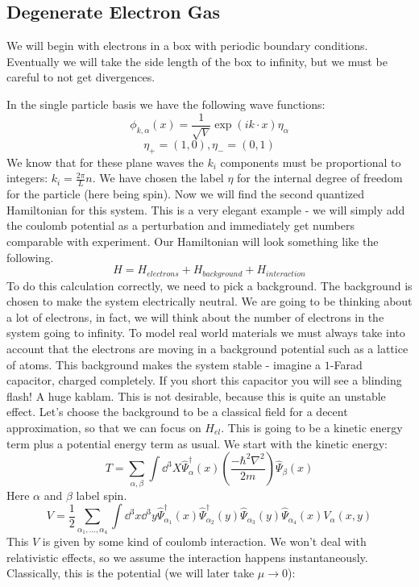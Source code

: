\documentclass{article}
\begin{document}
\subsection{Degenerate Electron Gas}
We will begin with electrons in a box with periodic boundary conditions. Eventually we will take the side length of the box to infinity, but we must be careful to not get divergences.

In the single particle basis we have the following wave functions:
\[\phi_{k,\alpha}(x)=\frac{1}{\sqrt{V}}\exp\left(ik\cdot x\right)\eta_\alpha\]
\[\eta_+ = (1,0), \eta_-=(0,1)\]
We know that for these plane waves the $k_i$ components must be proportional to integers: $k_i =\frac{2\pi}{L}n$. We have chosen the label $\eta$ for the internal degree of freedom for the particle (here being spin). Now we will find the second quantized Hamiltonian for this system. This is a very elegant example - we will simply add the coulomb potential as a perturbation and immediately get numbers comparable with experiment. Our Hamiltonian will look something like the following.
\begin{equation}
    H = H_{electrons}+H_{background}+H_{interaction}
\end{equation}
To do this calculation correctly, we need to pick a background. The background is chosen to make the system electrically neutral. We are going to be thinking about a lot of electrons, in fact, we will think about the number of electrons in the system going to infinity. To model real world materials we must always take into account that the electrons are moving in a background potential such as a lattice of atoms. This background makes the system stable - imagine a $1$-Farad capacitor, charged completely. If you short this capacitor you will see a blinding flash! A huge kablam. This is not desirable, because this is quite an unstable effect. Let's choose the background to be a classical field for a decent approximation, so that we can focus on $H_{el}$. This is going to be a kinetic energy term plus a potential energy term as usual. We start with the kinetic energy:
\[T = \sum_{\alpha, \beta}\int \dd^3 X \hat\Psi^\dagger_\alpha(x)\left(\frac{-\hbar^2\nabla^2}{2m}\right)\hat\Psi_\beta(x)\]
Here $\alpha$ and $\beta$ label spin.
\[V = \frac{1}{2}\sum_{\alpha_1,...,\alpha_4}\int \dd^3 x\dd^3 y \hat\Psi_{\alpha_1}^\dagger(x)\hat\Psi_{\alpha_2}^\dagger(y)\hat\Psi_{\alpha_3}(y)\hat\Psi_{\alpha_4}(x)V_{\alpha}(x,y)\]
This $V$ is given by some kind of coulomb interaction. We won't deal with relativistic effects, so we assume the interaction happens instantaneously. Classically, this is the potential (we will later take $\mu \to 0$):
\end{document}
